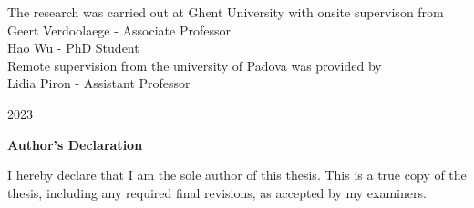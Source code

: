 \begin{titlepage}
\begin{center}
        \normalsize
        The research was carried out at Ghent University with onsite supervison from\\
        
        Geert Verdoolaege - Associate Professor\\
        Hao Wu - PhD Student\\
        \vspace{0.5cm}
        Remote supervision from the university of Padova was provided by\\
        
        Lidia Piron - Assistant Professor
        

        \vspace*{2.0cm}

        2023 \\
        \end{center}
\end{titlepage}


\pagestyle{plain}
\setcounter{page}{2}

\cleardoublepage %

 \begin{center}\textbf{Author's Declaration}\end{center}

 \noindent
I hereby declare that I am the sole author of this thesis. This is a true copy of the thesis, including any required final revisions, as accepted by my examiners.
 \noindent  
  \bigskip
  
